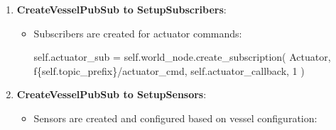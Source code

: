 \documentclass[
  letterpaper,
  DIV=11,
  numbers=noendperiod]{scrreprt}
\newenvironment{Shaded}{\begin{snugshade}}{\end{snugshade}}
\newcommand{\DecValTok}[1]{\textcolor[rgb]{0.68,0.00,0.00}{#1}}
\newcommand{\NormalTok}[1]{\textcolor[rgb]{0.00,0.23,0.31}{#1}}
\newcommand{\OperatorTok}[1]{\textcolor[rgb]{0.37,0.37,0.37}{#1}}
\newcommand{\SpecialCharTok}[1]{\textcolor[rgb]{0.37,0.37,0.37}{#1}}
\newcommand{\SpecialStringTok}[1]{\textcolor[rgb]{0.13,0.47,0.30}{#1}}
\newcommand{\StringTok}[1]{\textcolor[rgb]{0.13,0.47,0.30}{#1}}
\newcommand{\VariableTok}[1]{\textcolor[rgb]{0.07,0.07,0.07}{#1}}
\begin{document}
\begin{enumerate}
\begin{itemize}
\begin{Shaded}
\begin{Highlighting}[]
\VariableTok{self}\NormalTok{.odometry }\OperatorTok{=}\NormalTok{ \{}
    \StringTok{\textquotesingle{}pub\textquotesingle{}}\NormalTok{: }\VariableTok{self}\NormalTok{.world\_node.create\_publisher(Odometry, }\SpecialStringTok{f\textquotesingle{}}\SpecialCharTok{\{}\VariableTok{self}\SpecialCharTok{.}\NormalTok{topic\_prefix}\SpecialCharTok{\}}\SpecialStringTok{/odometry\_sim\textquotesingle{}}\NormalTok{, }\DecValTok{10}\NormalTok{),}
    \StringTok{\textquotesingle{}timer\textquotesingle{}}\NormalTok{: }\VariableTok{self}\NormalTok{.world\_node.create\_timer(}\VariableTok{self}\NormalTok{.vessel.vessel\_config[}\StringTok{\textquotesingle{}time\_step\textquotesingle{}}\NormalTok{], }\VariableTok{self}\NormalTok{.publish\_odometry)}
\NormalTok{\}}
\end{Highlighting}
\end{Shaded}
  \end{itemize}
\item
  \textbf{CreateVesselPubSub to SetupSubscribers}:

  \begin{itemize}
  \item
    Subscribers are created for actuator commands:

\begin{Shaded}
\begin{Highlighting}[]
\VariableTok{self}\NormalTok{.actuator\_sub }\OperatorTok{=} \VariableTok{self}\NormalTok{.world\_node.create\_subscription(}
\NormalTok{    Actuator, }
    \SpecialStringTok{f\textquotesingle{}}\SpecialCharTok{\{}\VariableTok{self}\SpecialCharTok{.}\NormalTok{topic\_prefix}\SpecialCharTok{\}}\SpecialStringTok{/actuator\_cmd\textquotesingle{}}\NormalTok{, }
    \VariableTok{self}\NormalTok{.actuator\_callback, }
    \DecValTok{1}
\NormalTok{)}
\end{Highlighting}
\end{Shaded}
  \end{itemize}
\item
  \textbf{CreateVesselPubSub to SetupSensors}:

  \begin{itemize}
  \item
    Sensors are created and configured based on vessel configuration:


\end{itemize}
\end{enumerate}
\end{document}
